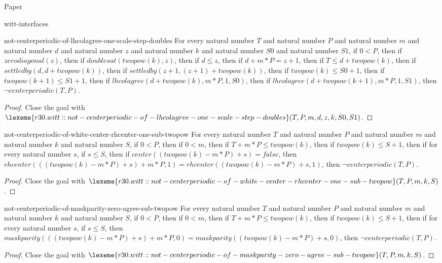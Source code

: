\begin{lexlean}{Paper}
\begin{section}{witt-interfaces}
  \begin{theorem}{not-centerperiodic-of-lhcolagree-one-scale-step-doubles}
  For every natural number \(T\) and natural number \(P\) and natural number \(m\) and natural number \(d\) and natural number \(z\) and natural number \(k\) and natural number \(S0\) and natural number \(S1\), if \(0 < P\), then if \(zerodiagonal(z)\), then if \(doublesat(twopow(k), z)\), then if \(d ≤ z\), then if \(d + m * P = z + 1\), then if \(T ≤ d + twopow(k)\), then if \(settledby(d, d + twopow(k))\), then if \(settledby(z + 1, (z + 1) + twopow(k))\), then if \(twopow(k) ≤ S0 + 1\), then if \(twopow(k + 1) ≤ S1 + 1\), then if \(lhcolagree(d + twopow(k), m * P, 1, S0)\), then if \(lhcolagree(d + twopow(k + 1), m * P, 1, S1)\), then \(¬ centerperiodic(T, P)\).
  \begin{proof}
  Close the goal with \(\lexeme{r30.witt::not-centerperiodic-of-lhcolagree-one-scale-step-doubles}(T, P, m, d, z, k, S0, S1)\).
  \end{proof}
  \end{theorem}

  \begin{theorem}{not-centerperiodic-of-white-center-rhcenter-one-sub-twopow}
  For every natural number \(T\) and natural number \(P\) and natural number \(m\) and natural number \(k\) and natural number \(S\), if \(0 < P\), then if \(0 < m\), then if \(T + m * P ≤ twopow(k)\), then if \(twopow(k) ≤ S + 1\), then if for every natural number \(s\), if \(s ≤ S\), then if \(center((twopow(k) - m * P) + s) = false\), then \(rhcenter(((twopow(k) - m * P) + s) + m * P, 1) = rhcenter((twopow(k) - m * P) + s, 1)\), then \(¬ centerperiodic(T, P)\).
  \begin{proof}
  Close the goal with \(\lexeme{r30.witt::not-centerperiodic-of-white-center-rhcenter-one-sub-twopow}(T, P, m, k, S)\).
  \end{proof}
  \end{theorem}

  \begin{theorem}{not-centerperiodic-of-maskparity-zero-agree-sub-twopow}
  For every natural number \(T\) and natural number \(P\) and natural number \(m\) and natural number \(k\) and natural number \(S\), if \(0 < P\), then if \(0 < m\), then if \(T + m * P ≤ twopow(k)\), then if \(twopow(k) ≤ S + 1\), then if for every natural number \(s\), if \(s ≤ S\), then \(maskparity(((twopow(k) - m * P) + s) + m * P, 0) = maskparity((twopow(k) - m * P) + s, 0)\), then \(¬ centerperiodic(T, P)\).
  \begin{proof}
  Close the goal with \(\lexeme{r30.witt::not-centerperiodic-of-maskparity-zero-agree-sub-twopow}(T, P, m, k, S)\).
  \end{proof}
  \end{theorem}


\end{section}
\end{lexlean}
